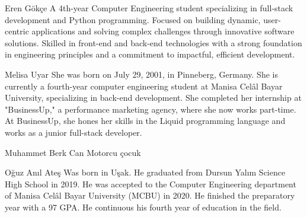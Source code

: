 \documentclass[a4paper,journal]{IEEEtran}
\begin{document}
\begin{IEEEbiography}{Eren Gökçe}
A 4th-year Computer Engineering student specializing in full-stack development
and Python programming.
Focused on building dynamic, user-centric applications and solving complex
challenges through innovative software
solutions.
Skilled in front-end and back-end technologies with a strong foundation in
engineering principles and a commitment to
impactful, efficient development.
\end{IEEEbiography}

\begin{IEEEbiography}{Melisa Uyar}
She was born on July 29, 2001, in Pinneberg, Germany.
She is currently a fourth-year computer engineering student at Manisa Celâl
Bayar University, specializing in back-end development.
She completed her internship at "BusinessUp," a performance marketing agency,
where she now works part-time.
At BusinessUp, she hones her skills in the Liquid programming language and
works as a junior full-stack developer.
\end{IEEEbiography}

\begin{IEEEbiography}{Muhammet Berk Can}
Motorcu çocuk
\end{IEEEbiography}

\begin{IEEEbiography}{Oğuz Anıl Ateş}
Was born in Uşak.
He graduated from Dursun Yalım Science High School in 2019.
He was accepted to the Computer Engineering department of Manisa Celâl Bayar
University (MCBU) in 2020.
He finished the preparatory year with a 97 GPA\@.
He continuous his fourth year of education in the field.
\end{IEEEbiography}
\end{document}
